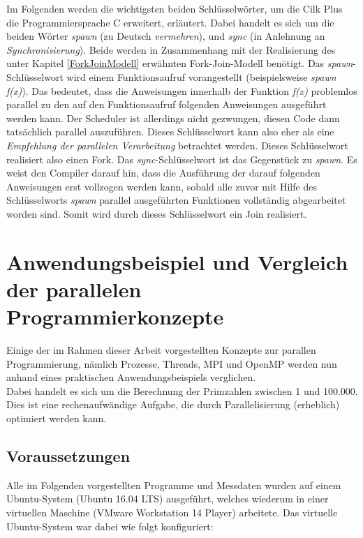 			Im Folgenden werden die wichtigsten beiden Schlüsselwörter, um die Cilk Plus die Programmiersprache C erweitert, erläutert. Dabei handelt es sich um die beiden Wörter \textit{spawn} (zu Deutsch \textit{vermehren}), und \textit{sync} (in Anlehnung an \textit{Synchronisierung}). Beide werden in Zusammenhang mit der Realisierung des unter Kapitel \ref{ForkJoinModell} erwähnten Fork-Join-Modell benötigt. Das \textit{spawn}-Schlüsselwort wird einem Funktionsaufruf vorangestellt (beispielsweise \textit{spawn f(x)}). Das bedeutet, dass die Anweisungen innerhalb der Funktion \textit{f(x)} problemlos parallel zu den auf den Funktionsaufruf folgenden Anweisungen ausgeführt werden kann. Der Scheduler ist allerdings nicht gezwungen, diesen Code dann tatsächlich parallel auszuführen. Dieses Schlüsselwort kann also eher als eine \textit{Empfehlung der parallelen Verarbeitung} betrachtet werden. Dieses Schlüsselwort realisiert also einen Fork. Das \textit{sync}-Schlüsselwort ist das Gegenstück zu \textit{spawn}. Es weist den Compiler darauf hin, dass die Ausführung der darauf folgenden Anweisungen erst vollzogen werden kann, sobald alle zuvor mit Hilfe des Schlüsselworts \textit{spawn} parallel ausgeführten Funktionen vollständig abgearbeitet worden sind. Somit wird durch dieses Schlüsselwort ein Join realisiert. \cite{CilkWikipedia}

	\section{Anwendungsbeispiel und Vergleich der parallelen Programmierkonzepte}

		Einige der im Rahmen dieser Arbeit vorgestellten Konzepte zur parallen Programmierung, nämlich Prozesse, Threads, MPI und OpenMP werden nun anhand eines praktischen Anwendungsbeispiels verglichen.\\
		Dabei handelt es sich um die Berechnung der Primzahlen zwischen 1 und 100.000. Dies ist eine rechenaufwändige Aufgabe, die durch Parallelisierung (erheblich) optimiert werden kann.
		
		\subsection{Voraussetzungen}
			
			Alle im Folgenden vorgestellten Programme und Messdaten wurden auf einem Ubuntu-System (Ubuntu 16.04 LTS) ausgeführt, welches wiederum in einer virtuellen Maschine (VMware Workstation 14 Player) arbeitete. Das virtuelle Ubuntu-System war dabei wie folgt konfiguriert:
			
